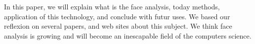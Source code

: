 In this paper, we will explain what is the face analysis, today methods, application of this technology, and conclude with futur uses. We based our reflexion on several papers, and web sites about this subject. We think face analysis is growing and will become an inescapable field of the computers science.

